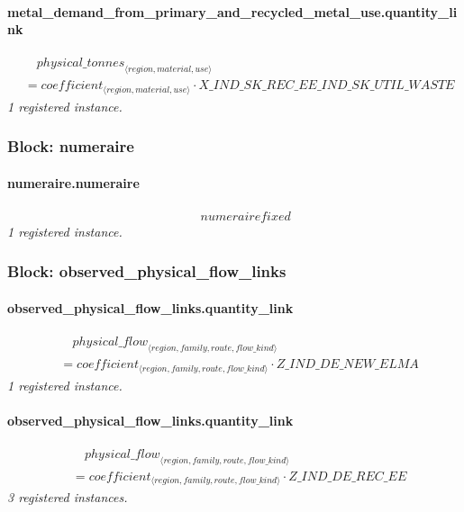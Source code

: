 \documentclass[11pt]{article}
\begin{document}
\paragraph{metal\_demand\_from\_primary\_and\_recycled\_metal\_use.quantity\_link}
\begin{align*}
&\quad {physical\_tonnes}_{\langle region, material, use\rangle}\\
&= coefficient_{\langle region, material, use\rangle} \cdot X\_IND\_SK\_REC\_EE\_IND\_SK\_UTIL\_WASTE
\end{align*}
\noindent\emph{1 registered instance.}\par
\subsubsection*{Block: numeraire}
\paragraph{numeraire.numeraire}
\begin{align*}
&\quad numeraire fixed
\end{align*}
\noindent\emph{1 registered instance.}\par
\subsubsection*{Block: observed\_physical\_flow\_links}
\paragraph{observed\_physical\_flow\_links.quantity\_link}
\begin{align*}
&\quad {physical\_flow}_{\langle region, family, route, flow\_kind\rangle}\\
&= coefficient_{\langle region, family, route, flow\_kind\rangle} \cdot Z\_IND\_DE\_NEW\_ELMA
\end{align*}
\noindent\emph{1 registered instance.}\par
\paragraph{observed\_physical\_flow\_links.quantity\_link}
\begin{align*}
&\quad {physical\_flow}_{\langle region, family, route, flow\_kind\rangle}\\
&= coefficient_{\langle region, family, route, flow\_kind\rangle} \cdot Z\_IND\_DE\_REC\_EE
\end{align*}
\noindent\emph{3 registered instances.}\par
\end{document}
